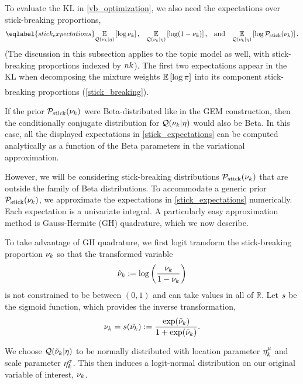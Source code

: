 To evaluate the $\mathrm{KL}$ in \eqref{vb_optimization}, we also need
the expectations over stick-breaking proportions,
\begin{align}\eqlabel{stick_expectations}
%
\expect{\q(\nuk \vert \eta)}{\log \nuk}
\textrm{,}\quad
\expect{\q(\nuk \vert \eta)}{\log (1 - \nuk)}
\textrm{,}\quad\textrm{and}\quad
\expect{\q(\nuk \vert \eta)}{\log \pstick(\nuk)}.
%
\end{align}
(The discussion in this subsection applies to the topic model as well,
with stick-breaking proportions indexed by $nk$).
The first two expectations appear in the $\mathrm{KL}$
when decomposing the mixture weights
$\underset{}{\mathbb{E}}\left[\log \pi\right]$ into its component stick-breaking proportions (\eqref{stick_breaking}).

If the prior $\mathcal{P}_{\mathrm{stick}}(\nu_{k})$ were Beta-distributed like in the GEM construction,
then the conditionally conjugate distribution for $\mathcal{Q}(\nu_{k} \vert \eta)$ would
also be Beta. In this case, all the displayed expectations in
\eqref{stick_expectations} can be computed analytically as a function of the
Beta parameters in the variational approximation.

However, we will be considering stick-breaking distributions $\mathcal{P}_{\mathrm{stick}}(\nu_{k})$
that are outside the family of Beta distributions. To accommodate a generic
prior $\mathcal{P}_{\mathrm{stick}}(\nu_{k})$, we approximate the expectations in
\eqref{stick_expectations} numerically. Each expectation is a univariate
integral. A particularly easy approximation method is Gauss-Hermite (GH)
quadrature, which we now describe.

To take advantage of GH quadrature, we first logit transform the stick-breaking
proportion $\nu_{k}$ so that the transformed variable
\begin{align*}
  \tilde{\nu}_{k} := \log\left(\frac{\nu_{k}}{1 - \nu_{k}}\right)
\end{align*}
is not constrained to be between $(0, 1)$ and can take values in all of $\mathbb{R}$.
Let $s$ be the sigmoid function,
which provides the inverse transformation,
\begin{align*}
  \nu_{k} = s(\tilde{\nu_{k}}) := \frac{\exp(\tilde{\nu}_k)}{1 + \exp(\tilde{\nu}_k)}.
\end{align*}

We choose $\mathcal{Q}(\tilde{\nu}_k \vert \eta)$ to be normally distributed with
location parameter $\eta^{\mu}_k$ and scale parameter $\eta^{\sigma}_k$.
This then induces a logit-normal
distribution on our original variable of interest, $\nu_{k}$.

